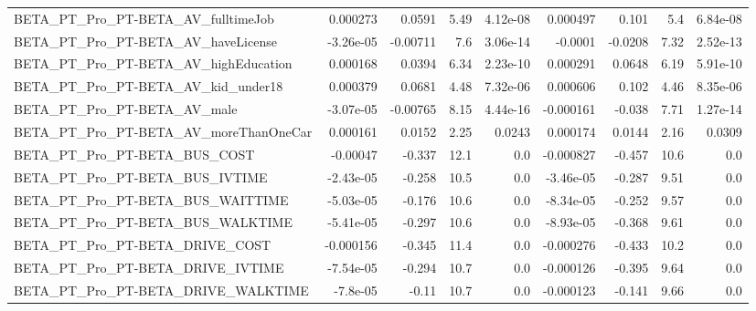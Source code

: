 \begin{tabular}{lrrrrrrrr}
BETA\_PT\_Pro\_PT-BETA\_AV\_fulltimeJob                 &    0.000273 &       0.0591 &      5.49 & 4.12e-08 &   0.000497 &       0.101 &          5.4 &      6.84e-08 \\
BETA\_PT\_Pro\_PT-BETA\_AV\_haveLicense                 &   -3.26e-05 &     -0.00711 &       7.6 & 3.06e-14 &    -0.0001 &     -0.0208 &         7.32 &      2.52e-13 \\
BETA\_PT\_Pro\_PT-BETA\_AV\_highEducation               &    0.000168 &       0.0394 &      6.34 & 2.23e-10 &   0.000291 &      0.0648 &         6.19 &      5.91e-10 \\
BETA\_PT\_Pro\_PT-BETA\_AV\_kid\_under18                 &    0.000379 &       0.0681 &      4.48 & 7.32e-06 &   0.000606 &       0.102 &         4.46 &      8.35e-06 \\
BETA\_PT\_Pro\_PT-BETA\_AV\_male                        &   -3.07e-05 &     -0.00765 &      8.15 & 4.44e-16 &  -0.000161 &      -0.038 &         7.71 &      1.27e-14 \\
BETA\_PT\_Pro\_PT-BETA\_AV\_moreThanOneCar              &    0.000161 &       0.0152 &      2.25 &   0.0243 &   0.000174 &      0.0144 &         2.16 &        0.0309 \\
BETA\_PT\_Pro\_PT-BETA\_BUS\_COST                       &    -0.00047 &       -0.337 &      12.1 &      0.0 &  -0.000827 &      -0.457 &         10.6 &           0.0 \\
BETA\_PT\_Pro\_PT-BETA\_BUS\_IVTIME                     &   -2.43e-05 &       -0.258 &      10.5 &      0.0 &  -3.46e-05 &      -0.287 &         9.51 &           0.0 \\
BETA\_PT\_Pro\_PT-BETA\_BUS\_WAITTIME                   &   -5.03e-05 &       -0.176 &      10.6 &      0.0 &  -8.34e-05 &      -0.252 &         9.57 &           0.0 \\
BETA\_PT\_Pro\_PT-BETA\_BUS\_WALKTIME                   &   -5.41e-05 &       -0.297 &      10.6 &      0.0 &  -8.93e-05 &      -0.368 &         9.61 &           0.0 \\
BETA\_PT\_Pro\_PT-BETA\_DRIVE\_COST                     &   -0.000156 &       -0.345 &      11.4 &      0.0 &  -0.000276 &      -0.433 &         10.2 &           0.0 \\
BETA\_PT\_Pro\_PT-BETA\_DRIVE\_IVTIME                   &   -7.54e-05 &       -0.294 &      10.7 &      0.0 &  -0.000126 &      -0.395 &         9.64 &           0.0 \\
BETA\_PT\_Pro\_PT-BETA\_DRIVE\_WALKTIME                 &    -7.8e-05 &        -0.11 &      10.7 &      0.0 &  -0.000123 &      -0.141 &         9.66 &           0.0 \\

\end{tabular}

